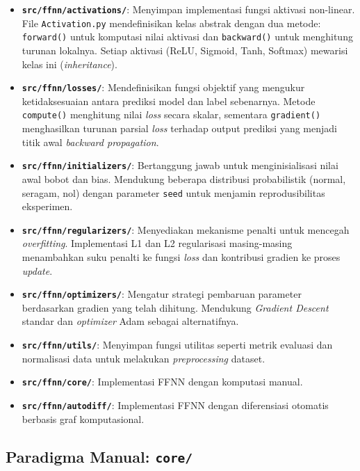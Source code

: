 \begin{itemize}
    \item \textbf{\texttt{src/ffnn/activations/}}: Menyimpan implementasi fungsi aktivasi non-linear. File \texttt{Activation.py} mendefinisikan kelas abstrak dengan dua metode: \texttt{forward()} untuk komputasi nilai aktivasi dan \texttt{backward()} untuk menghitung turunan lokalnya. Setiap aktivasi (ReLU, Sigmoid, Tanh, Softmax) mewarisi kelas ini (\textit{inheritance}).
    \item \textbf{\texttt{src/ffnn/losses/}}: Mendefinisikan fungsi objektif yang mengukur ketidaksesuaian antara prediksi model dan label sebenarnya. Metode \texttt{compute()} menghitung nilai \textit{loss} secara skalar, sementara \texttt{gradient()} menghasilkan turunan parsial \textit{loss} terhadap output prediksi yang menjadi titik awal \textit{backward propagation}.
    \item \textbf{\texttt{src/ffnn/initializers/}}: Bertanggung jawab untuk menginisialisasi nilai awal bobot dan bias. Mendukung beberapa distribusi probabilistik (normal, seragam, nol) dengan parameter \texttt{seed} untuk menjamin reprodusibilitas eksperimen.
    \item \textbf{\texttt{src/ffnn/regularizers/}}: Menyediakan mekanisme penalti untuk mencegah \textit{overfitting}. Implementasi L1 dan L2 regularisasi masing-masing menambahkan suku penalti ke fungsi \textit{loss} dan kontribusi gradien ke proses \textit{update}.
    \item \textbf{\texttt{src/ffnn/optimizers/}}: Mengatur strategi pembaruan parameter berdasarkan gradien yang telah dihitung. Mendukung \textit{Gradient Descent} standar dan \textit{optimizer} Adam sebagai alternatifnya.
    \item \textbf{\texttt{src/ffnn/utils/}}: Menyimpan fungsi utilitas seperti metrik evaluasi dan normalisasi data untuk melakukan \textit{preprocessing} dataset.
    \item \textbf{\texttt{src/ffnn/core/}}: Implementasi FFNN dengan komputasi manual.
    \item \textbf{\texttt{src/ffnn/autodiff/}}: Implementasi FFNN dengan diferensiasi otomatis berbasis graf komputasional.
\end{itemize}

\subsection{Paradigma Manual: \texttt{core/}}

